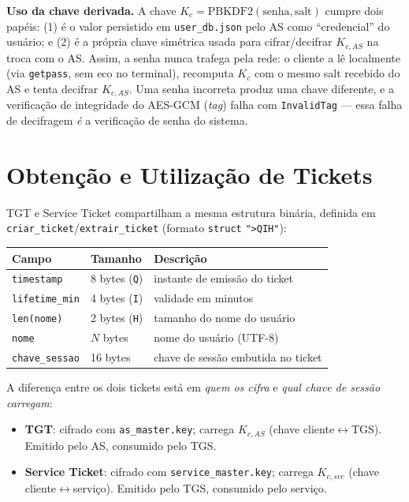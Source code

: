 \documentclass[11pt,a4paper]{article}
\begin{document}
\textbf{Uso da chave derivada.} A chave $K_c = \text{PBKDF2}(\text{senha}, \text{salt})$
cumpre dois papéis: (1) é o valor persistido em \texttt{user\_db.json} pelo AS como
``credencial'' do usuário; e (2) é a própria chave simétrica usada para cifrar/decifrar
$K_{c,AS}$ na troca com o AS. Assim, a senha nunca trafega pela rede: o cliente a lê
localmente (via \texttt{getpass}, sem eco no terminal), recomputa $K_c$ com o mesmo salt
recebido do AS e tenta decifrar $K_{c,AS}$. Uma senha incorreta produz uma chave diferente,
e a verificação de integridade do AES-GCM (\emph{tag}) falha com \texttt{InvalidTag} ---
essa falha de decifragem \emph{é} a verificação de senha do sistema.

\section{Obtenção e Utilização de Tickets}

TGT e Service Ticket compartilham a mesma estrutura binária, definida em
\texttt{criar\_ticket}/\texttt{extrair\_ticket} (formato \texttt{struct} \texttt{">QIH"}):

\begin{center}
\begin{tabular}{@{}lll@{}}
\toprule
Campo & Tamanho & Descrição \\
\midrule
\texttt{timestamp} & 8 bytes (\texttt{Q}) & instante de emissão do ticket \\
\texttt{lifetime\_min} & 4 bytes (\texttt{I}) & validade em minutos \\
\texttt{len(nome)} & 2 bytes (\texttt{H}) & tamanho do nome do usuário \\
\texttt{nome} & $N$ bytes & nome do usuário (UTF-8) \\
\texttt{chave\_sessao} & 16 bytes & chave de sessão embutida no ticket \\
\bottomrule
\end{tabular}
\end{center}

A diferença entre os dois tickets está em \emph{quem os cifra} e \emph{qual chave de
sessão carregam}:

\begin{itemize}
    \item \textbf{TGT}: cifrado com \texttt{as\_master.key}; carrega $K_{c,AS}$ (chave
    cliente$\leftrightarrow$TGS). Emitido pelo AS, consumido pelo TGS.
    \item \textbf{Service Ticket}: cifrado com \texttt{service\_master.key}; carrega
    $K_{c,svc}$ (chave cliente$\leftrightarrow$serviço). Emitido pelo TGS, consumido pelo
    serviço.
\end{itemize}
\end{document}
